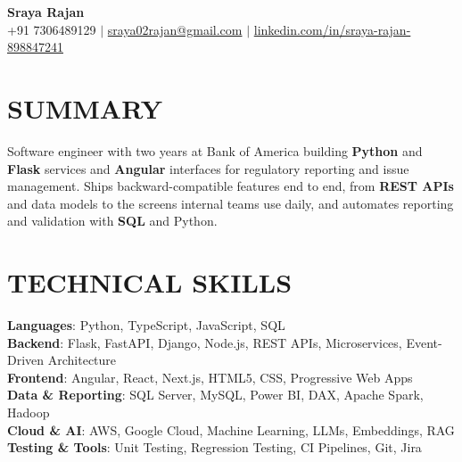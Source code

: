 \documentclass[letterpaper,11pt]{article}
\begin{document}

\begin{center}
  \textbf{\huge Sraya Rajan} \\ \vspace{3pt}
  \small {\headerfont +91 7306489129} {\scriptsize $|$}
  {\headerfont \href{mailto:sraya02rajan@gmail.com}{sraya02rajan@gmail.com}} {\scriptsize $|$}
  {\headerfont \href{https://www.linkedin.com/in/sraya-rajan-898847241}{linkedin.com/in/sraya-rajan-898847241}}
\end{center}

\section{SUMMARY}
\begin{justify}
\small{
Software engineer with two years at Bank of America building \textbf{Python} and \textbf{Flask} services and \textbf{Angular} interfaces for regulatory reporting and issue management. Ships backward-compatible features end to end, from \textbf{REST APIs} and data models to the screens internal teams use daily, and automates reporting and validation with \textbf{SQL} and Python.
}
\end{justify}

\section{TECHNICAL SKILLS}
\begin{itemize}[leftmargin=0in, label={}, itemsep=0pt, parsep=0pt]
    \small{
      \item{
        \textbf{Languages}{: Python, TypeScript, JavaScript, SQL}\vspace{2pt} \\
        \textbf{Backend}{: Flask, FastAPI, Django, Node.js, REST APIs, Microservices, Event-Driven Architecture}\vspace{2pt} \\
        \textbf{Frontend}{: Angular, React, Next.js, HTML5, CSS, Progressive Web Apps}\vspace{2pt} \\
        \textbf{Data \& Reporting}{: SQL Server, MySQL, Power BI, DAX, Apache Spark, Hadoop}\vspace{2pt} \\
        \textbf{Cloud \& AI}{: AWS, Google Cloud, Machine Learning, LLMs, Embeddings, RAG}\vspace{2pt} \\
        \textbf{Testing \& Tools}{: Unit Testing, Regression Testing, CI Pipelines, Git, Jira}
      }
    }
\end{itemize}
\end{document}
